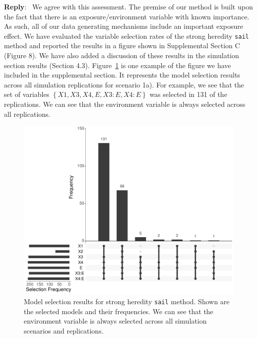 \documentclass[11pt]{article}
\newenvironment{reply}
   {\medskip \noindent \begin{sf}\textbf{Reply}:\  }
   {\medskip \end{sf}}
\begin{document}
\begin{reply}
We agree with this assessment. The premise of our method is built upon the fact that there is an exposure/environment variable with known importance. As such, all of our data generating mechanisms include an important exposure effect. We have evaluated the variable selection rates of the strong heredity \texttt{sail} method and reported the results in a figure shown in Supplemental Section C (Figure 8). We have also added a discussion of these results in the simulation section results (Section 4.3). Figure~\ref{fig:upset} is one example of the figure we have included in the supplemental section. It represents the model selection results across all simulation replications for scenario 1a). For example, we see that the set of variables $\left\lbrace X1, X3, X4, E, X3:E, X4:E \right\rbrace$ was selected in 131 of the replications. We can see that the environment variable is always selected across all replications.  

\begin{figure}[h]
    \centering
\includegraphics[width=\textwidth]{figure/upset_selection_sail_paramIndex1.pdf}
    \caption{Model selection results for strong heredity \texttt{sail} method. Shown are the selected models and their frequencies. We can see that the environment variable is always selected across all simulation scenarios and replications.}
    \label{fig:upset}
\end{figure}
\end{reply}
\end{document}
